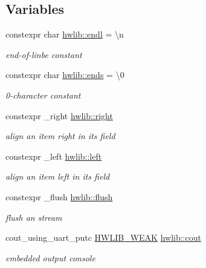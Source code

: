 \subsection*{Variables}
\begin{DoxyCompactItemize}
\item 
constexpr char \hyperlink{namespacehwlib_a89ce110cc897f61657f1edca18e4cef7}{hwlib\+::endl} = \textquotesingle{}\textbackslash{}n\textquotesingle{}\hypertarget{namespacehwlib_a89ce110cc897f61657f1edca18e4cef7}{}\label{namespacehwlib_a89ce110cc897f61657f1edca18e4cef7}

\begin{DoxyCompactList}\small\item\em end-\/of-\/linbe constant \end{DoxyCompactList}\item 
constexpr char \hyperlink{namespacehwlib_ac708935d0fc9beb71bb55a7c35e69a16}{hwlib\+::ends} = \textquotesingle{}\textbackslash{}0\textquotesingle{}\hypertarget{namespacehwlib_ac708935d0fc9beb71bb55a7c35e69a16}{}\label{namespacehwlib_ac708935d0fc9beb71bb55a7c35e69a16}

\begin{DoxyCompactList}\small\item\em 0-\/character constant \end{DoxyCompactList}\item 
constexpr \+\_\+right \hyperlink{namespacehwlib_a26a6aead1d4dc1a990ab77bf2b730740}{hwlib\+::right}
\begin{DoxyCompactList}\small\item\em align an item right in its field \end{DoxyCompactList}\item 
constexpr \+\_\+left \hyperlink{namespacehwlib_a7d9a4ef3e66da75048c5b3e67cf401d8}{hwlib\+::left}
\begin{DoxyCompactList}\small\item\em align an item left in its field \end{DoxyCompactList}\item 
constexpr \+\_\+flush \hyperlink{namespacehwlib_a648fe94ca9899747a632c23f97007732}{hwlib\+::flush}
\begin{DoxyCompactList}\small\item\em flush an stream \end{DoxyCompactList}\item 
cout\+\_\+using\+\_\+uart\+\_\+putc \hyperlink{hwlib-defines_8hpp_a04be4340016df60d6636c1d1c6d94fc9}{H\+W\+L\+I\+B\+\_\+\+W\+E\+AK} \hyperlink{namespacehwlib_ac985c212834e4eb219aedede6efff2dc}{hwlib\+::cout}
\begin{DoxyCompactList}\small\item\em embedded output console \end{DoxyCompactList}\end{DoxyCompactItemize}
